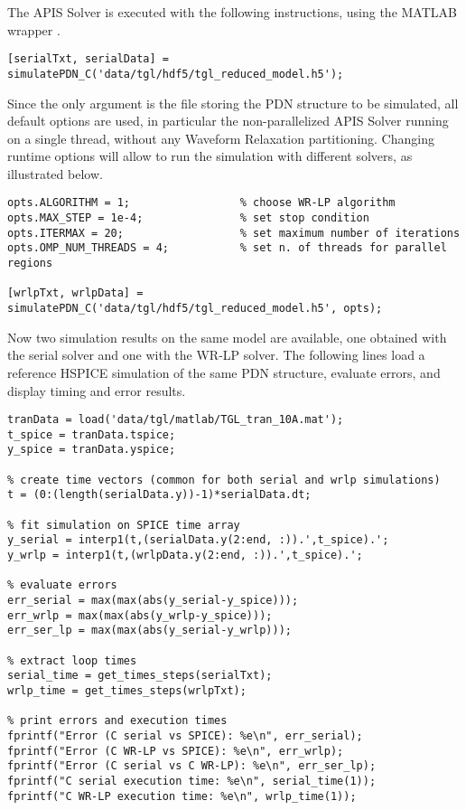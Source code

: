 The APIS Solver is executed with the following instructions, using the MATLAB wrapper .

\begin{lstlisting}[numbers=none]
[serialTxt, serialData] = simulatePDN_C('data/tgl/hdf5/tgl_reduced_model.h5');
\end{lstlisting}

Since the only argument is the file storing the PDN structure to be simulated, all default options are used, in particular the non-parallelized APIS Solver running on a single thread, without any Waveform Relaxation partitioning. Changing runtime options will allow to run the simulation with different solvers, as illustrated below.

\begin{lstlisting}[numbers=none]
opts.ALGORITHM = 1;                 % choose WR-LP algorithm
opts.MAX_STEP = 1e-4;               % set stop condition
opts.ITERMAX = 20;                  % set maximum number of iterations
opts.OMP_NUM_THREADS = 4;           % set n. of threads for parallel regions

[wrlpTxt, wrlpData] = simulatePDN_C('data/tgl/hdf5/tgl_reduced_model.h5', opts);
\end{lstlisting}

Now two simulation results on the same model are available, one obtained with the serial solver and one with the WR-LP solver. The following lines load a reference HSPICE simulation of the same PDN structure, evaluate errors, and display timing and error results.

\begin{lstlisting}[numbers=none]
% load tgl reference simulation
tranData = load('data/tgl/matlab/TGL_tran_10A.mat');
t_spice = tranData.tspice;
y_spice = tranData.yspice;

% create time vectors (common for both serial and wrlp simulations)
t = (0:(length(serialData.y))-1)*serialData.dt;

% fit simulation on SPICE time array
y_serial = interp1(t,(serialData.y(2:end, :)).',t_spice).';
y_wrlp = interp1(t,(wrlpData.y(2:end, :)).',t_spice).';

% evaluate errors
err_serial = max(max(abs(y_serial-y_spice)));
err_wrlp = max(max(abs(y_wrlp-y_spice)));
err_ser_lp = max(max(abs(y_serial-y_wrlp)));

% extract loop times
serial_time = get_times_steps(serialTxt);
wrlp_time = get_times_steps(wrlpTxt);

% print errors and execution times
fprintf("Error (C serial vs SPICE): %e\n", err_serial);
fprintf("Error (C WR-LP vs SPICE): %e\n", err_wrlp);
fprintf("Error (C serial vs C WR-LP): %e\n", err_ser_lp);
fprintf("C serial execution time: %e\n", serial_time(1));
fprintf("C WR-LP execution time: %e\n", wrlp_time(1));
\end{lstlisting}

